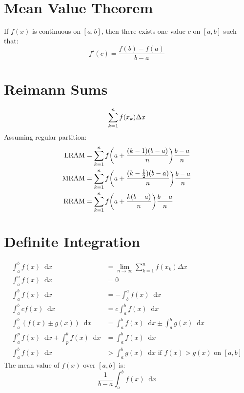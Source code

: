 \documentclass[12pt]{article}
\DeclarePairedDelimiter\paren{(}{)}
\newcommand*{\D}[1]{\mathop{}\!\mathrm{d}#1}
\newcommand*{\fixmath}{%
  \makebox{}\vspace{\glueexpr-\baselineskip-\abovedisplayskip}}
\newenvironment{fixaskip}{\setlength{\abovedisplayskip}{0pt}\fixmath%
  \ignorespaces}{\ignorespacesafterend}
\newenvironment{fixbskip}{\setlength{\belowdisplayskip}{0pt}\ignorespaces}%
  {\ignorespacesafterend}
\begin{document}
\section*{Mean Value Theorem}
If \(f(x)\) is continuous on \([a,b]\), then there exists one value \(c\) on
\([a,b]\) such that:
\begin{fixbskip}
  \[
    f'(c) = \frac{f(b) - f(a)}{b - a}
  \]
\end{fixbskip}
\section*{Reimann Sums}
\begin{fixaskip}
  \[
    \sum_{k=1}^n f(x_k) \Delta x\\
  \]
\end{fixaskip}
Assuming regular partition:
\begin{fixbskip}
  \begin{align*}
    \text{LRAM} &= \sum_{k=1}^n f\paren*{a + \frac{(k-1)(b - a)}{n}}
      \frac{b-a}{n}\\
    \text{MRAM} &= \sum_{k=1}^n f\paren*{a + \frac{(k-\frac{1}{2})(b - a)}{n}}
      \frac{b-a}{n}\\
    \text{RRAM} &= \sum_{k=1}^n f\paren*{a + \frac{k(b - a)}{n}}
      \frac{b-a}{n}
  \end{align*}
\end{fixbskip}
\section*{Definite Integration}
\begin{fixaskip}
  \begin{align*}
    \int_a^b f(x) \D{x} &= \lim_{n \to \infty} \sum_{k=1}^n f(x_k)\Delta x\\
    \int_a^a f(x) \D{x} &= 0\\
    \int_a^b f(x) \D{x} &= -\int_b^a f(x) \D{x}\\
    \int_a^b c f(x) \D{x} &= c \int_a^b f(x) \D{x}\\
    \int_a^b (f(x) \pm g(x)) \D{x} &= \int_a^b f(x) \D{x} \pm \int_a^b g(x)
      \D{x}\\
    \int_a^p f(x) \D{x} + \int_p^b f(x) \D{x} &= \int_a^b f(x) \D{x}\\
    \int_a^b f(x) \D{x} &> \int_a^b g(x) \D{x} \text{ if }f(x) > g(x)
      \text{ on } [a,b]
  \end{align*}
\end{fixaskip}
The mean value of \(f(x)\) over \([a,b]\) is:
\begin{fixbskip}
  \[
    \frac{1}{b - a} \int_a^b f(x) \D{x}
  \]
\end{fixbskip}
\end{document}
